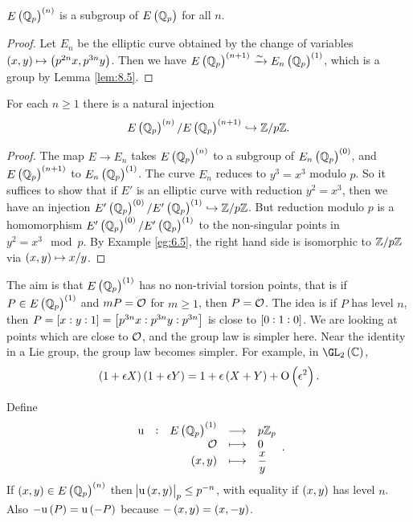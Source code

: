 \begin{corollary}
$ E\br{\QQ_p}^{\br{n}} $ is a subgroup of $ E\br{\QQ_p} $ for all $ n $.
\end{corollary}

\begin{proof}
Let $ E_n $ be the elliptic curve obtained by the change of variables $ \br{x, y} \mapsto \br{p^{2n}x, p^{3n}y} $. Then we have $ E\br{\QQ_p}^{\br{n + 1}} \xrightarrow{\sim} E_n\br{\QQ_p}^{\br{1}} $, which is a group by Lemma \ref{lem:8.5}.
\end{proof}

\begin{corollary}
For each $ n \ge 1 $ there is a natural injection
$$ E\br{\QQ_p}^{\br{n}} / E\br{\QQ_p}^{\br{n + 1}} \hookrightarrow \ZZ / p\ZZ. $$
\end{corollary}

\begin{proof}
The map $ E \to E_n $ takes $ E\br{\QQ_p}^{\br{n}} $ to a subgroup of $ E_n\br{\QQ_p}^{\br{0}} $, and $ E\br{\QQ_p}^{\br{n + 1}} $ to $ E_n\br{\QQ_p}^{\br{1}} $. The curve $ E_n $ reduces to $ y^3 = x^3 $ modulo $ p $. So it suffices to show that if $ E' $ is an elliptic curve with reduction $ y^2 = x^3 $, then we have an injection $ E'\br{\QQ_p}^{\br{0}} / E'\br{\QQ_p}^{\br{1}} \hookrightarrow \ZZ / p\ZZ $. But reduction modulo $ p $ is a homomorphism $ E'\br{\QQ_p}^{\br{0}} / E'\br{\QQ_p}^{\br{1}} $ to the non-singular points in $ y^2 = x^3 \mod p $. By Example \ref{eg:6.5}, the right hand side is isomorphic to $ \mathbb{Z} / p\mathbb{Z} $ via $ \br{x, y} \mapsto x / y $.
\end{proof}


\begin{remark}
The aim is that $ E\br{\QQ_p}^{\br{1}} $ has no non-trivial torsion points, that is if $ P \in E\br{\QQ_p}^{\br{1}} $ and $ mP = \mathcal{O} $ for $ m \ge 1 $, then $ P = \mathcal{O} $. The idea is if $ P $ has level $ n $, then $ P = \sbr{x : y : 1} = \sbr{p^{3n}x : p^{3n}y : p^{3n}} $ is close to $ \sbr{0 : 1 : 0} $. We are looking at points which are close to $ \mathcal{O} $, and the group law is simpler here. Near the identity in a Lie group, the group law becomes simpler. For example, in $ \GL_2\br{\CC} $,
$$ \br{1 + \epsilon X}\br{1 + \epsilon Y} = 1 + \epsilon\br{X + Y} + \O\br{\epsilon^2}. $$
\end{remark}

Define
$$ \functions[\u]{E\br{\QQ_p}^{\br{1}}}{p\ZZ_p}{\OOO}{0}{\br{x, y}}{\dfrac{x}{y}}. $$
If $ \br{x, y} \in E\br{\QQ_p}^{\br{n}} $ then $ \abs{\u\br{x, y}}_p \le p^{-n} $, with equality if $ \br{x, y} $ has level $ n $. Also $ -\u\br{P} = \u\br{-P} $ because $ -\br{x, y} = \br{x, -y} $.

